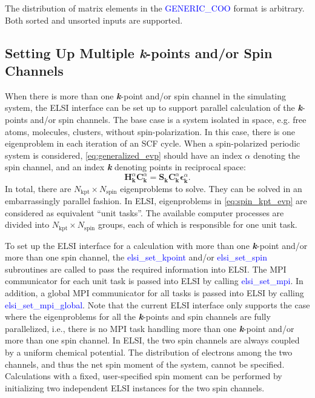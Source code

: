\documentclass{report}
\begin{document}
The distribution of matrix elements in the \textcolor{blue}{GENERIC\_COO} format is arbitrary.  Both sorted and unsorted inputs are supported.

\subsection{Setting Up Multiple \textbf{\textit{k}}-points and/or Spin Channels}
\label{subsec:setup_kpt}
When there is more than one \textbf{\textit{k}}-point and/or spin channel in the simulating system, the ELSI interface can be set up to support parallel calculation of the \textbf{\textit{k}}-points and/or spin channels.  The base case is a system isolated in space, e.g. free atoms, molecules, clusters, without spin-polarization.  In this case, there is one eigenproblem in each iteration of an SCF cycle.  When a spin-polarized periodic system is considered, \ref{eq:generalized_evp} should have an index $\alpha$ denoting the spin channel, and an index \textbf{\textit{k}} denoting points in reciprocal space:
\begin{equation}
\label{eq:spin_kpt_evp}
\boldsymbol{H}_{\boldsymbol{k}}^\alpha \boldsymbol{C}_{\boldsymbol{k}}^\alpha = \boldsymbol{S}_{\boldsymbol{k}} \boldsymbol{C}_{\boldsymbol{k}}^\alpha \boldsymbol{\epsilon}_{\boldsymbol{k}}^\alpha .
\end{equation}
In total, there are $N_\text{kpt} \times N_\text{spin}$ eigenproblems to solve.  They can be solved in an embarrassingly parallel fashion.  In ELSI, eigenproblems in \ref{eq:spin_kpt_evp} are considered as equivalent ``unit tasks''.  The available computer processes are divided into $N_\text{kpt} \times N_\text{spin}$ groups, each of which is responsible for one unit task.

To set up the ELSI interface for a calculation with more than one \textbf{\textit{k}}-point and/or more than one spin channel,  the \textcolor{blue}{elsi\_set\_kpoint} and/or \textcolor{blue}{elsi\_set\_spin} subroutines are called to pass the required information into ELSI.  The MPI communicator for each unit task is passed into ELSI by calling \textcolor{blue}{elsi\_set\_mpi}.  In addition, a global MPI communicator for all tasks is passed into ELSI by calling \textcolor{blue}{elsi\_set\_mpi\_global}.  Note that the current ELSI interface only supports the case where the eigenproblems for all the \textbf{\textit{k}}-points and spin channels are fully parallelized, i.e., there is no MPI task handling more than one \textbf{\textit{k}}-point and/or more than one spin channel.  In ELSI, the two spin channels are always coupled by a uniform chemical potential.  The distribution of electrons among the two channels, and thus the net spin moment of the system, cannot be specified.  Calculations with a fixed, user-specified spin moment can be performed by initializing two independent ELSI instances for the two spin channels.
\end{document}
